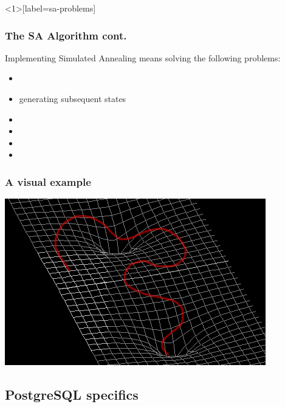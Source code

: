 \documentclass{beamer}
\begin{document}
\begin{frame}<1>[label=sa-problems]
  \frametitle<1>{The SA Algorithm cont.}

Implementing Simulated Annealing means solving the following problems:

  \begin{itemize}
  \item {}
  \item \alert<4->{generating subsequent states}
  \item {}
  \item {}
  \item {}
  \item {}
  \end{itemize}

  \begin{center}
  \end{center}
\end{frame}


\begin{frame}
  \frametitle{A visual example}
  \includegraphics[width=\textwidth]{curve.png}
\end{frame}

\subsection{PostgreSQL specifics}
\end{document}
